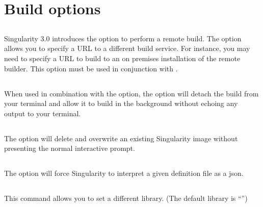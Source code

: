 \documentclass[letterpaper,10pt,english]{sphinxmanual}
\begin{document}
\section{Build options}
\label{\detokenize{build_a_container:build-options}}

\subsection{}
\label{\detokenize{build_a_container:builder}}
Singularity 3.0 introduces the option to perform a remote build. The
 option allows you to specify a URL to a different build service.
For instance, you may need to specify a URL to build to an on premises
installation of the remote builder.  This option must be used in conjunction
with .


\subsection{}
\label{\detokenize{build_a_container:detached}}
When used in combination with the  option, the  option
will detach the build from your terminal and allow it to build in the background
without echoing any output to your terminal.


\subsection{}
\label{\detokenize{build_a_container:force}}
The  option will delete and overwrite an existing Singularity image
without presenting the normal interactive prompt.


\subsection{}
\label{\detokenize{build_a_container:json}}
The  option will force Singularity to interpret a given definition
file as a json.


\subsection{}
\label{\detokenize{build_a_container:library}}
This command allows you to set a different library.  (The default library is
“”)
\end{document}

